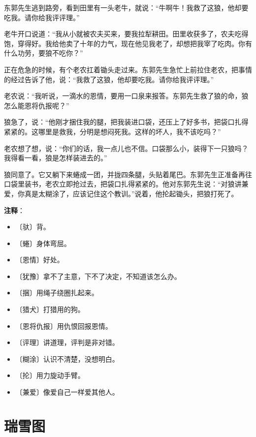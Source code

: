 \documentclass[12pt,UTF-8,openany]{ctexbook}
\begin{document}
\begin{Large}
    东郭先生逃到路旁，看到田里有一头老牛，就说：“牛啊牛！我救了这狼，他却要吃我。请你给我评评理。”
    
    老牛开口说道：“我从小就被农夫买来，要我拉犁耕田。田里收获多了，农夫吃得饱，穿得好。我给他卖了十年的力气，现在他见我老了，却想把我宰了吃肉。你有什么功劳，要狼不吃你？”
    
    正在危急的时候，有个老农扛着锄头走过来。东郭先生急忙上前拉住老农，把事情的经过告诉了他，说：“我救了这狼，他却要吃我。请你给我评评理。”
    
    老农说：“我听说，一滴水的恩情，要用一口泉来报答。东郭先生救了狼的命，狼怎么能恩将仇报呢？”
    
    狼急了，说：“他刚才捆住我的腿，把我装进口袋，还压上了好多书，把袋口扎得紧紧的。这哪里是救我，分明是想闷死我。这样的坏人，我不该吃吗？”
    
    老农想了想，说：“你们的话，我一点儿也不信。口袋那么小，装得下一只狼吗？我得看一看，狼是怎样装进去的。”
    
    狼同意了。它又躺下来蜷成一团，并拢四条腿，头贴着尾巴。东郭先生正准备再往口袋里装书，老农立即抢过去，把袋口扎得紧紧的。他对东郭先生说：“对狼讲兼爱，你真是太糊涂了，应该记住这个教训。”说着，他抡起锄头，把狼打死了。
    
\end{Large}


\newpage

\textbf{注释}：

\vspace{-1em}

\begin{itemize}
    \setlength\itemsep{-0.2em}
    \item 〔驮〕背。
    \item 〔蜷〕身体弯屈。
    \item 〔恩情〕好处。
    \item 〔犹豫〕拿不了主意，下不了决定，不知道该怎么办。
    \item 〔捆〕用绳子绕圈扎起来。
    \item 〔猎犬〕打猎用的狗。
    \item 〔恩将仇报〕用仇恨回报恩情。
    \item 〔评理〕讲道理，评判是非对错。
    \item 〔糊涂〕认识不清楚，没想明白。
    \item 〔抡〕用力旋动手臂。
    \item 〔兼爱〕像爱自己一样爱其他人。
\end{itemize}

\chapter{瑞雪图}
\end{document}
